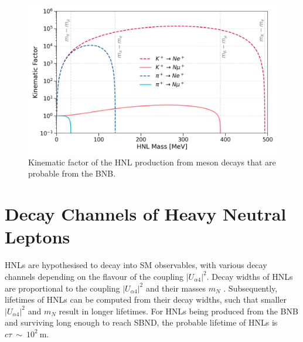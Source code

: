 
\begin{figure}[t] 
\centering    
\includegraphics[width=1.0\textwidth]{kinematics_factor}
\caption[Kinematic Factor of Heavy Neutral Leptons]{
Kinematic factor of the HNL production from meson decays that are probable from the BNB.
}
\label{fig:KinematicsFactor}
\end{figure}

\section{Decay Channels of Heavy Neutral Leptons}
\label{sec2Decay}


HNLs are hypothesised to decay into SM observables, with various decay channels depending on the flavour of the coupling $|U_{\alpha4}|^2$.
Decay widths of HNLs are proportional to the coupling $|U_{\alpha4}|^2$ and their masses $m_N$ \cite {HNLBin, SBNHNL, HNLZarko}.
Subsequently, lifetimes of HNLs can be computed from their decay widths, such that smaller $|U_{\alpha4}|^2$ and $m_N$ result in longer lifetimes.
For HNLs being produced from the BNB and surviving long enough to reach SBND, the probable lifetime of HNLs is $c\tau~\sim~10^2~\mathrm{m}$. 

